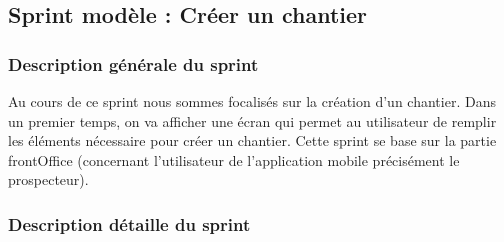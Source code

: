 \subsection{Sprint mod\`ele : Cr\'eer un chantier}

\subsubsection{Description g\'en\'erale du sprint}

Au cours de ce sprint nous sommes focalis\'es sur la cr\'eation d'un chantier. Dans un premier temps, on va afficher une \'ecran qui permet au utilisateur de remplir les \'el\'ements n\'ecessaire pour cr\'eer un chantier. Cette sprint se base sur la partie frontOffice (concernant l'utilisateur de l'application mobile pr\'ecis\'ement le prospecteur).

\subsubsection{Description d\'etaille du sprint}

